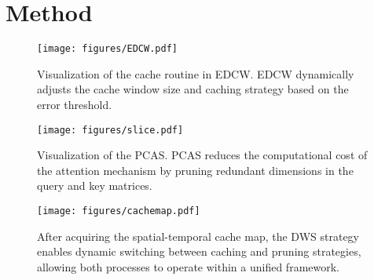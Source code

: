 \section{Method}
\label{sec:method}

\begin{figure}[t] %
    \centering
    \texttt{[image: figures/EDCW.pdf]} 
    \caption{Visualization of the cache routine in EDCW. EDCW dynamically adjusts the cache window size and caching strategy based on the error threshold.}
    \label{fig:cache}
    \vspace{-3mm}
\end{figure}
\begin{figure}[t] %
    \centering
    \texttt{[image: figures/slice.pdf]} 
    \caption{Visualization of the PCAS. PCAS reduces the computational cost of the attention mechanism by pruning redundant dimensions in the query and key matrices.}
    \label{fig:slice}
    \vspace{-4mm}
\end{figure}
\begin{figure}[t]
    \centering
    \texttt{[image: figures/cachemap.pdf]}
    \caption{After acquiring the spatial-temporal cache map, the DWS strategy enables dynamic switching between caching and pruning strategies, allowing both processes to operate within a unified framework.}
    \label{fig:Cache map}
\vspace{-4mm}
\end{figure}
